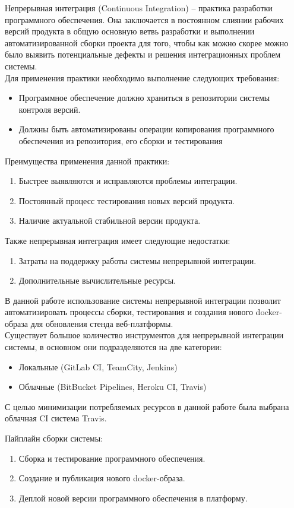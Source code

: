 \documentclass[a4paper,14pt]{extreport} %
\begin{document}
Непрерывная интеграция (Continuous Integration) -- практика разработки программного обеспечения. Она заключается в постоянном слиянии рабочих версий продукта в общую основную ветвь разработки и выполнении автоматизированной сборки проекта для того, чтобы как можно скорее можно было выявить потенциальные дефекты и решения интеграционных проблем системы. \\
Для применения практики необходимо выполнение следующих требования: 
\begin{itemize}
\item Программное обеспечение должно храниться в репозитории системы контроля версий.
\item Должны быть автоматизированы операции копирования программного обеспечения из репозитория, его сборки и тестирования
\end{itemize}
Преимущества применения данной практики:
\begin{enumerate}
\item Быстрее выявляются и исправляются проблемы интеграции.
\item Постоянный процесс тестирования новых версий продукта.
\item Наличие актуальной стабильной версии продукта. 
\end{enumerate}
Также непрерывная интеграция имеет следующие недостатки:
\begin{enumerate}
\item Затраты на поддержку работы системы непрерывной интеграции.
\item Дополнительные вычислительные ресурсы.
\end{enumerate}

В данной работе использование системы непрерывной интеграции позволит автоматизировать процессы сборки, тестирования и создания нового docker-образа для обновления стенда веб-платформы. \\
Существует большое количество инструментов для непрерывной интеграции системы, в основном они подразделяются на две категории:
\begin{itemize}
\item Локальные (GitLab CI, TeamCity, Jenkins)
\item Облачные (BitBucket Pipelines, Heroku CI, Travis)
\end{itemize}

С целью минимизации потребляемых ресурсов в данной работе была выбрана облачная CI система Travis.

Пайплайн сборки системы:
\begin{enumerate}
\item Сборка и тестирование программного обеспечения.
\item Создание и публикация нового docker-образа.
\item Деплой новой версии программного обеспечения в платформу.
\end{enumerate}
\end{document}
